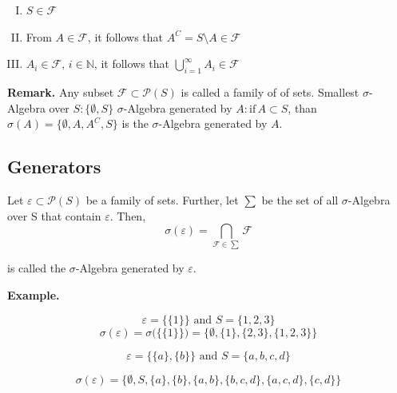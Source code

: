 \documentclass{scrarticle}
\begin{document}
\begin{enumerate}[I.]
    \item  $S \in \mathcal{F}$
    \item From $A \in \mathcal{F}$, it follows that $A^C=S \setminus A \in \mathcal{F}$
    \item $A_i \in \mathcal{F},\,i\in \mathbb{N}$, it follows that $\bigcup_{i=1}^\infty A_i \in \mathcal{F}$
\end{enumerate}

\textbf{Remark.} Any subset $\mathcal{F} \subset \mathcal{P}(S)$ is called a family of of sets. Smallest $\sigma$-Algebra over $S: \{\emptyset, S\}$
$\sigma$-Algebra generated by $A: \text{if}\, A \subset S$, than $\sigma (A) = \{ \emptyset, A, A^C, S \}$ is the $\sigma$-Algebra generated by $A$.


\subsection{Generators}
Let $\varepsilon \subset \mathcal{P}(S)$ be a family of sets. Further, let $\sum$ be the set of all $\sigma$-Algebra over S that contain $\varepsilon$. Then, 
\begin{equation}
    \sigma(\varepsilon) = \underset{\mathcal{F \in \sum}}{\bigcap} \mathcal{F}
\end{equation}

is called the $\sigma$-Algebra generated by $\varepsilon$.
\vspace{0.3cm}

\textbf{Example.} 

\begin{equation*}
    \varepsilon = \big \{ \{1\} \big \} \text{ and } S=\{1,2,3\}
\end{equation*}
\begin{equation*}
    \sigma(\varepsilon) = \sigma \Big (\big \{ \{1\} \big \} \Big ) = \big \{\emptyset, \{1\}, \{2,3\}, \{1,2,3\} \big \}
\end{equation*}

\begin{equation*}
    \varepsilon = \big \{ \{a\}, \{b\} \big \} \text{ and } S=\{a,b,c,d\}
\end{equation*}

\begin{equation*}
    \sigma (\varepsilon) = \big \{ \emptyset, S, \{a\}, \{b\}, \{a, b\}, \{b, c, d\}, \{a, c, d\}, \{c, d\} \big \} 
\end{equation*}
\end{document}
